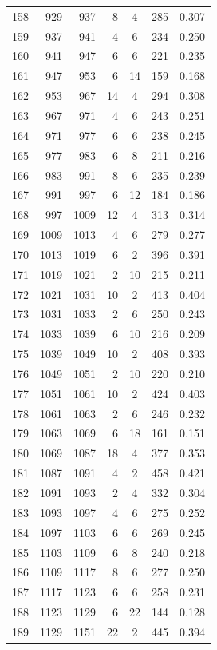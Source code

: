 \documentclass[12pt]{article}
\theoremstyle{plain}
\theoremstyle{definition}
\theoremstyle{remark}
\begin{document}
\begin{center}
\begin{small}
\begin{longtable}{@{}crrrccc@{}}
158 & 929 & 937 & 8 & 4 & 285 & 0.307 \\
159 & 937 & 941 & 4 & 6 & 234 & 0.250 \\
160 & 941 & 947 & 6 & 6 & 221 & 0.235 \\
161 & 947 & 953 & 6 & 14 & 159 & 0.168 \\
162 & 953 & 967 & 14 & 4 & 294 & 0.308 \\
163 & 967 & 971 & 4 & 6 & 243 & 0.251 \\
164 & 971 & 977 & 6 & 6 & 238 & 0.245 \\
165 & 977 & 983 & 6 & 8 & 211 & 0.216 \\
166 & 983 & 991 & 8 & 6 & 235 & 0.239 \\
167 & 991 & 997 & 6 & 12 & 184 & 0.186 \\
168 & 997 & 1009 & 12 & 4 & 313 & 0.314 \\
169 & 1009 & 1013 & 4 & 6 & 279 & 0.277 \\
170 & 1013 & 1019 & 6 & 2 & 396 & 0.391 \\
171 & 1019 & 1021 & 2 & 10 & 215 & 0.211 \\
172 & 1021 & 1031 & 10 & 2 & 413 & 0.404 \\
173 & 1031 & 1033 & 2 & 6 & 250 & 0.243 \\
174 & 1033 & 1039 & 6 & 10 & 216 & 0.209 \\
175 & 1039 & 1049 & 10 & 2 & 408 & 0.393 \\
176 & 1049 & 1051 & 2 & 10 & 220 & 0.210 \\
177 & 1051 & 1061 & 10 & 2 & 424 & 0.403 \\
178 & 1061 & 1063 & 2 & 6 & 246 & 0.232 \\
179 & 1063 & 1069 & 6 & 18 & 161 & 0.151 \\
180 & 1069 & 1087 & 18 & 4 & 377 & 0.353 \\
181 & 1087 & 1091 & 4 & 2 & 458 & 0.421 \\
182 & 1091 & 1093 & 2 & 4 & 332 & 0.304 \\
183 & 1093 & 1097 & 4 & 6 & 275 & 0.252 \\
184 & 1097 & 1103 & 6 & 6 & 269 & 0.245 \\
185 & 1103 & 1109 & 6 & 8 & 240 & 0.218 \\
186 & 1109 & 1117 & 8 & 6 & 277 & 0.250 \\
187 & 1117 & 1123 & 6 & 6 & 258 & 0.231 \\
188 & 1123 & 1129 & 6 & 22 & 144 & 0.128 \\
189 & 1129 & 1151 & 22 & 2 & 445 & 0.394 \\

\end{longtable}
\end{small}
\end{center}
\end{document}
